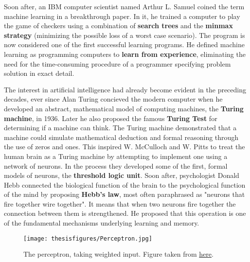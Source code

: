 \documentclass[twoside,english]{uiofysmaster}
\begin{document}
Soon after, an IBM computer scientist named Arthur L. Samuel coined the term machine learning in a breakthrough paper. In it, he trained a computer to play the game of checkers using a combination of \textbf{search trees} and the \textbf{minmax strategy} (minimizing the possible loss of a worst case scenario). The program is now considered one of the first successful learning programs. He defined machine learning as programming computers to \textbf{learn from experience}, eliminating the need for the time-consuming procedure of a programmer specifying problem solution in exact detail. 

The interest in artificial intelligence had already become evident in the preceding decades, ever since Alan Turing concieved the modern computer when he developed an abstract, mathematical model of computing machines, the \textbf{Turing machine}, in 1936. Later he also proposed the famous \textbf{Turing Test} for determining if a machine can think. The Turing machine demonstrated that a machine could simulate mathematical deduction and formal reasoning through the use of zeros and ones. This inspired W. McCulloch and W. Pitts to treat the human brain as a Turing machine by attempting to implement one using a network of neurons. In the process they developed some of the first, formal models of neurons, the \textbf{threshold logic unit}. Soon after, psychologist Donald Hebb connected the biological function of the brain to the psychological function of the mind by proposing \textbf{Hebb's law}, most often paraphrased as "neurons that fire together wire together". It means that when two neurons fire together the connection between them is strengthened. He proposed that this operation is one of the fundamental mechanisms underlying learning and memory.


\begin{figure}
\centering
 \texttt{[image: thesisfigures/Perceptron.jpg]}
 \caption{The perceptron, taking weighted input. Figure taken from \href{http://kindsonthegenius.blogspot.com/2018/01/what-is-perceptron-how-perceptron-works.html}{here}.}
 \label{fig:Perceptron}
\end{figure}
\end{document}
